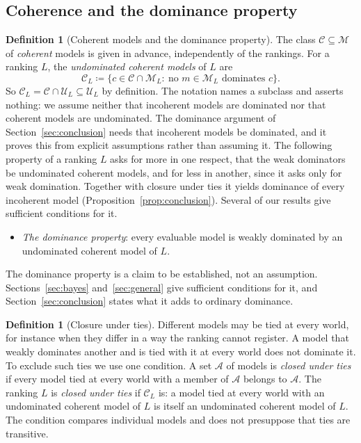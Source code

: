 \documentclass[11pt]{article}
\theoremstyle{definition}
\newtheorem{definition}[theorem]{Definition}
\theoremstyle{remark}
\newcommand{\M}{\mathcal M}
\newcommand{\C}{\mathcal C}
\newcommand{\U}{\mathcal U}
\begin{document}
\subsection{Coherence and the dominance property}
\begin{definition}[Coherent models and the dominance property]\label{def:coherence-property}
The class $\C\subseteq\M$ of \emph{coherent} models is given in advance, independently of the rankings. For a ranking $L$, the \emph{undominated coherent models} of $L$ are
\[
\C_L\coloneqq\{c\in\C\cap\M_L:\ \text{no } m\in\M_L \text{ dominates } c\}.
\]
So $\C_L=\C\cap\U_L\subseteq\U_L$ by definition. The notation names a subclass and asserts nothing: we assume neither that incoherent models are dominated nor that coherent models are undominated. The dominance argument of Section~\ref{sec:conclusion} needs that incoherent models be dominated, and it proves this from explicit assumptions rather than assuming it. The following property of a ranking $L$ asks for more in one respect, that the weak dominators be undominated coherent models, and for less in another, since it asks only for weak domination. Together with closure under ties it yields dominance of every incoherent model (Proposition~\ref{prop:conclusion}). Several of our results give sufficient conditions for it.
\begin{itemize}[leftmargin=*]
\item \emph{The dominance property}: every evaluable model is weakly dominated by an undominated coherent model of $L$.
\end{itemize}
\end{definition}

The dominance property is a claim to be established, not an assumption. Sections~\ref{sec:bayes} and~\ref{sec:general} give sufficient conditions for it, and Section~\ref{sec:conclusion} states what it adds to ordinary dominance.

\begin{definition}[Closure under ties]\label{def:tie-closure}
Different models may be tied at every world, for instance when they differ in a way the ranking cannot register. A model that weakly dominates another and is tied with it at every world does not dominate it. To exclude such ties we use one condition. A set $\mathcal A$ of models is \emph{closed under ties} if every model tied at every world with a member of $\mathcal A$ belongs to $\mathcal A$. The ranking $L$ is \emph{closed under ties} if $\C_L$ is: a model tied at every world with an undominated coherent model of $L$ is itself an undominated coherent model of $L$. The condition compares individual models and does not presuppose that ties are transitive.
\end{definition}
\end{document}
